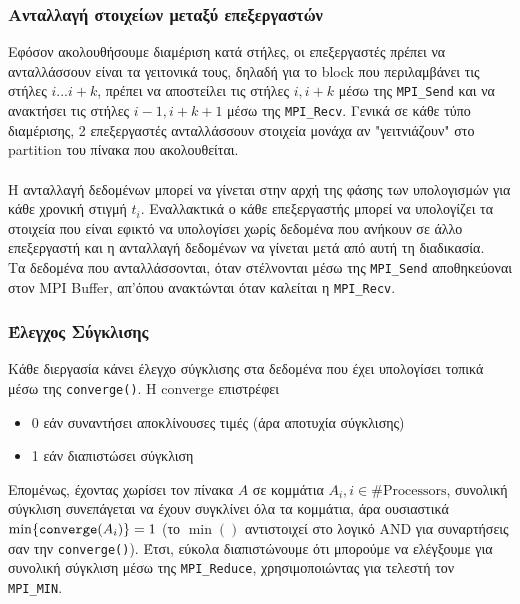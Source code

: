 \documentclass[11pt,a4paper]{article}
\begin{document}
\subsubsection{Ανταλλαγή στοιχείων μεταξύ επεξεργαστών}
Εφόσον ακολουθήσουμε διαμέριση κατά στήλες, οι επεξεργαστές πρέπει να ανταλλάσσουν είναι τα γειτονικά τους, 
δηλαδή για το block που περιλαμβάνει τις στήλες $i...i+k$, πρέπει να αποστείλει τις στήλες $i, i+k$ μέσω της \texttt{MPI\_Send}
και να ανακτήσει τις στήλες $i-1, i+k+1$ μέσω της \texttt{MPI\_Recv}. Γενικά σε κάθε τύπο διαμέρισης, 2 επεξεργαστές ανταλλάσσουν στοιχεία μονάχα αν "γειτνιάζουν" στο partition του πίνακα που ακολουθείται. \\ \\
Η ανταλλαγή δεδομένων μπορεί να γίνεται στην αρχή της φάσης των υπολογισμών για κάθε χρονική στιγμή $t_i$. Εναλλακτικά ο κάθε επεξεργαστής μπορεί να υπολογίζει τα στοιχεία που είναι εφικτό να υπολογίσει χωρίς δεδομένα που ανήκουν σε άλλο επεξεργαστή και η ανταλλαγή δεδομένων να γίνεται μετά από αυτή τη διαδικασία. \\
Τα δεδομένα που ανταλλάσσονται, όταν στέλνονται μέσω της \texttt{MPI\_Send} αποθηκεύοναι στον MPI Buffer, απ'όπου ανακτώνται όταν καλείται η \texttt{MPI\_Recv}.

\subsubsection{Έλεγχος Σύγκλισης}
Κάθε διεργασία κάνει έλεγχο σύγκλισης στα δεδομένα που έχει υπολογίσει τοπικά μέσω της \texttt{converge()}. Η converge επιστρέφει 
\begin{itemize}
	\item 0 εάν συναντήσει αποκλίνουσες τιμές (άρα αποτυχία σύγκλισης)
	\item 1 εάν διαπιστώσει σύγκλιση
\end{itemize}
Επομένως, έχοντας χωρίσει τον πίνακα $A$ σε κομμάτια $A_i, i \in \text{\#Processors} $, συνολική σύγκλιση συνεπάγεται να έχουν συγκλίνει όλα τα κομμάτια, άρα ουσιαστικά $ \min\{\text{\texttt{converge}}(A_i) \} = 1$ (το $\min()$ αντιστοιχεί στο λογικό AND για συναρτήσεις σαν την \texttt{converge()}). Έτσι, εύκολα διαπιστώνουμε ότι μπορούμε να ελέγξουμε για συνολική σύγκλιση μέσω της \texttt{MPI\_Reduce}, χρησιμοποιώντας για τελεστή τον \texttt{MPI\_MIN}.
\end{document}

